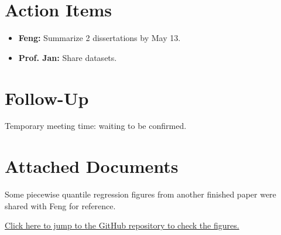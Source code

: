 \documentclass[11pt]{article}
\begin{document}
\section*{Action Items}
\begin{itemize}[leftmargin=1.5em]
    \item \textbf{Feng:} Summarize 2 dissertations by May 13.
    \item \textbf{Prof. Jan:} Share datasets.
\end{itemize}

\section*{Follow-Up}
Temporary meeting time: waiting to be confirmed.

\section{Attached Documents}
Some piecewise quantile regression figures from another finished paper were shared with Feng for reference.

\href{https://github.com/Gufeng-2002/Thesis_Meeting_Notes/tree/main/May_5th_25_meeting1/supportive_materials}{Click here to jump to the GitHub repository to check the figures.}
\end{document}
